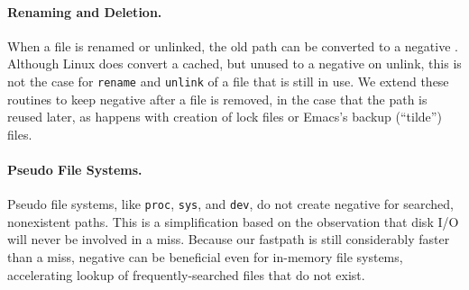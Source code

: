 
\paragraph{Renaming and Deletion.}
When a file is renamed or unlinked, the old path can be converted to a negative \dentry{}.
Although Linux does convert a cached, but unused \dentry{} to a negative \dentry{} on unlink,
this is not the case for {\tt rename} and {\tt unlink} of a file that is still in use.
We extend these routines to keep negative \dentries{} after a file is removed, in the case
that the path is reused later, as happens with creation of lock files or Emacs's backup (``tilde'') files.




\paragraph{Pseudo File Systems.}
Pseudo file systems, like {\tt proc}, {\tt sys}, and {\tt dev},
do not create negative \dentries{} for searched, nonexistent paths.
This is a simplification based on the observation that disk I/O will never be involved in a miss.
Because our fastpath is still considerably faster than a miss, negative \dentries{} can be beneficial
even for in-memory file systems,
accelerating lookup of frequently-searched  files that do not exist. 


